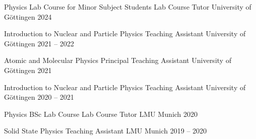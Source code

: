


\begin{cvhonors}[4.5cm]

  \cvhonor
    {Physics Lab Course for Minor Subject Students} %
    {Lab Course Tutor} %
    {University of G\"ottingen} %
    {2024} %

  \cvhonor
    {Introduction to Nuclear and Particle Physics} %
    {Teaching Assistant} %
    {University of G\"ottingen} %
    {2021 -- 2022} %

  \cvhonor
    {Atomic and Molecular Physics} %
    {%
      Principal Teaching Assistant%
    } %
    {University of G\"ottingen} %
    {2021} %

  \cvhonor
    {Introduction to Nuclear and Particle Physics} %
    {Teaching Assistant} %
    {University of G\"ottingen} %
    {2020 -- 2021} %

  \cvhonor
    {Physics BSc Lab Course} %
    {Lab Course Tutor} %
    {LMU Munich} %
    {2020} %

  \cvhonor
    {Solid State Physics} %
    {Teaching Assistant} %
    {LMU Munich} %
    {2019 -- 2020} %

\end{cvhonors}
